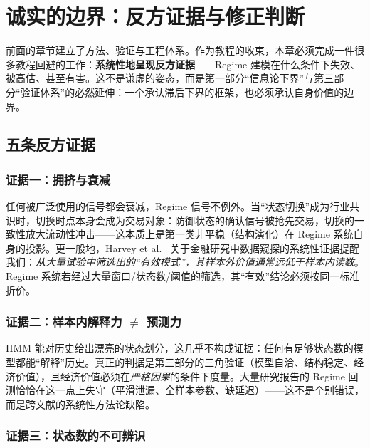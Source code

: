 
\section{诚实的边界：反方证据与修正判断}
\label{sec:boundaries}

前面的章节建立了方法、验证与工程体系。作为教程的收束，本章必须完成一件很多教程回避的工作：\textbf{系统性地呈现反方证据}——Regime 建模在什么条件下失效、被高估、甚至有害。这不是谦虚的姿态，而是第一部分“信息论下界”与第三部分“验证体系”的必然延伸：一个承认滞后下界的框架，也必须承认自身价值的边界。

\subsection{五条反方证据}

\subsubsection{证据一：拥挤与衰减}

任何被广泛使用的信号都会衰减，Regime 信号不例外。当“状态切换”成为行业共识时，切换时点本身会成为交易对象：防御状态的确认信号被抢先交易，切换的一致性放大流动性冲击——这本质上是第一类非平稳（结构演化）在 Regime 系统自身的投影。更一般地，Harvey et al.~\cite{harvey2016} 关于金融研究中数据窥探的系统性证据提醒我们：\emph{从大量试验中筛选出的“有效模式”，其样本外价值通常远低于样本内读数}。Regime 系统若经过大量窗口/状态数/阈值的筛选，其“有效”结论必须按同一标准折价。

\subsubsection{证据二：样本内解释力 \texorpdfstring{$\ne$}{不等于} 预测力}

HMM 能对历史给出漂亮的状态划分，这几乎不构成证据：任何有足够状态数的模型都能“解释”历史。真正的判据是第三部分的三角验证（模型自洽、结构稳定、经济价值），且经济价值必须在\emph{严格因果}的条件下度量。大量研究报告的 Regime 回测恰恰在这一点上失守（平滑泄漏、全样本参数、缺延迟）——这不是个别错误，而是跨文献的系统性方法论缺陷。

\subsubsection{证据三：状态数的不可辨识}

